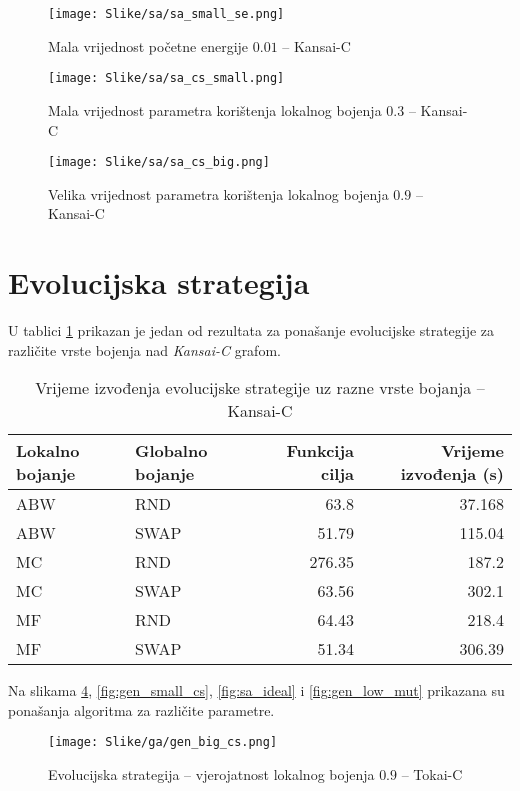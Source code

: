\documentclass[times, utf8, diplomski, numeric]{fer}
\begin{document}
\begin{figure}[htb]
	\texttt{[image: Slike/sa/sa\_small\_se.png]}
	\caption{Mala vrijednost početne energije $0.01$ -- Kansai-C}
	\label{fig:sa_small_se}
\end{figure}

\begin{figure}[htb]
	\texttt{[image: Slike/sa/sa\_cs\_small.png]}
	\caption{Mala vrijednost parametra korištenja lokalnog bojenja $0.3$ -- Kansai-C}
	\label{fig:sa_cs_small}
\end{figure}

\begin{figure}[htb]
	\texttt{[image: Slike/sa/sa\_cs\_big.png]}
	\caption{Velika vrijednost parametra korištenja lokalnog bojenja $0.9$ -- Kansai-C}
	\label{fig:sa_cs_big}
\end{figure}


\section{Evolucijska strategija}

U tablici \ref{tbl:es-cs1} prikazan je jedan od rezultata za ponašanje evolucijske strategije za različite vrste bojenja nad \emph{Kansai-C} grafom.

\begin{table}[htb]
	\caption{Vrijeme izvođenja evolucijske strategije uz razne vrste bojanja -- Kansai-C}
	\label{tbl:es-cs1}
	\centering
	\begin{tabular}{|l||l|r|r|} \hline
	Lokalno bojanje & Globalno bojanje & Funkcija cilja & Vrijeme izvođenja (s)\\ \hline \hline
	ABW & RND & 63.8 & 37.168 \\ \hline 
	ABW & SWAP & 51.79 & 115.04 \\  \hline
	MC & RND & 276.35 & 187.2 \\ \hline
	MC & SWAP & 63.56 &  302.1 \\  \hline 
	MF & RND & 64.43 & 218.4 \\ \hline
	MF & SWAP & 51.34 & 306.39 \\ \hline
	\end{tabular}
\end{table}

Na slikama \ref{fig:gen_big_cs}, \ref{fig:gen_small_cs}, \ref{fig:sa_ideal} i \ref{fig:gen_low_mut} prikazana su ponašanja algoritma za različite parametre.

\begin{figure}[htb]
	\texttt{[image: Slike/ga/gen\_big\_cs.png]}
	\caption{Evolucijska strategija -- vjerojatnost lokalnog bojenja $0.9$ -- Tokai-C}
	\label{fig:gen_big_cs}
\end{figure}
\end{document}
